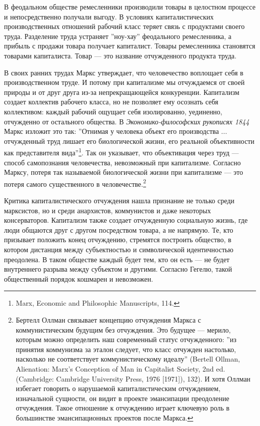 \documentclass[12pt]{book}
\begin{document}
В феодальном обществе ремесленники производили товары в целостном процессе и непосредственно получали выгоду. В условиях капиталистических производственных отношений рабочий класс теряет связь с продуктами своего труда. Разделение труда устраняет ''ноу-хау'' феодального ремесленника, а прибыль с продажи товара получает капиталист. Товары ремесленника становятся товарами капиталиста. Товар --- это название отчужденного продукта труда.

В своих ранних трудах Маркс утверждает, что человечество воплощает себя в производственном труде. И потому при капитализме мы отчуждаемся от своей природы и от друг друга из-за непрекращающейся конкуренции. Капитализм создает коллектив рабочего класса, но не позволяет ему осознать себя коллективом: каждый рабочий ощущает себя изолированно, уединенно, отчужденно от остального общества. В \textit{Экономико-философских рукописях 1844} Маркс изложит это так: ''Отнимая у человека объект его производства ... отчужденный труд лишает его биологической жизни, его реальной объективности как представителя вида''\footnote{Marx, Economic and Philosophic Manuscripts, 114.}. Так он указывает, что объективация через труд --- способ самопознания человечества, невозможный при капитализме. Согласно Марксу, потеря так называемой биологической жизни при капитализме --- это потеря самого существенного в человечестве.\footnote{Бертелл Оллман связывает концепцию отчуждения Маркса с коммунистическим будущим без отчуждения. Это будущее --- мерило, которым можно определить наш современный статус отчужденного: ''из принятия коммунизма за эталон следует, что класс отчужден настолько, насколько не соответствует коммунистическому идеалу'' (Bertell Ollman, Alienation: Marx’s Conception of Man in Capitalist Society, 2nd ed. (Cambridge: Cambridge University Press, 1976 [1971]), 132). И хотя Оллман избегает говорить о нарушаемой капиталистическим отчуждением, изначальной сущности, он видит в проекте эмансипации преодоление отчуждения. Такое отношение к отчуждению играет ключевую роль в большинстве эмансипационных проектов после Маркса.}

Критика капиталистического отчуждения нашла признание не только среди марксистов, но и среди анархистов, коммунистов и даже некоторых консерваторов. Капитализм также создает отчужденную социальную жизнь, где люди общаются друг с другом посредством товара, а не напрямую. Те, кто призывает положить конец отчуждению, стремятся построить общество, в котором дистанция между субъектностью и символической идентичностью преодолена. В таком обществе каждый будет тем, кто он есть --- не будет внутреннего разрыва между субъектом и другими. Согласно Гегелю, такой общественный порядок кошмарен и невозможен.
\end{document}
